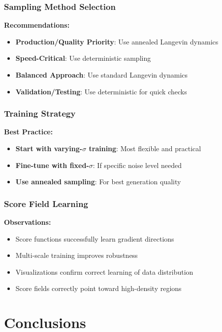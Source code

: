 \documentclass[12pt,a4paper]{article}
\begin{document}
\subsubsection{Sampling Method Selection}

\textbf{Recommendations:}
\begin{itemize}
    \item \textbf{Production/Quality Priority}: Use annealed Langevin dynamics
    \item \textbf{Speed-Critical}: Use deterministic sampling
    \item \textbf{Balanced Approach}: Use standard Langevin dynamics
    \item \textbf{Validation/Testing}: Use deterministic for quick checks
\end{itemize}

\subsubsection{Training Strategy}

\textbf{Best Practice:}
\begin{itemize}
    \item \textbf{Start with varying-$\sigma$ training}: Most flexible and practical
    \item \textbf{Fine-tune with fixed-$\sigma$}: If specific noise level needed
    \item \textbf{Use annealed sampling}: For best generation quality
\end{itemize}

\subsubsection{Score Field Learning}

\textbf{Observations:}
\begin{itemize}
    \item Score functions successfully learn gradient directions
    \item Multi-scale training improves robustness
    \item Visualizations confirm correct learning of data distribution
    \item Score fields correctly point toward high-density regions
\end{itemize}

\section{Conclusions}
\end{document}
